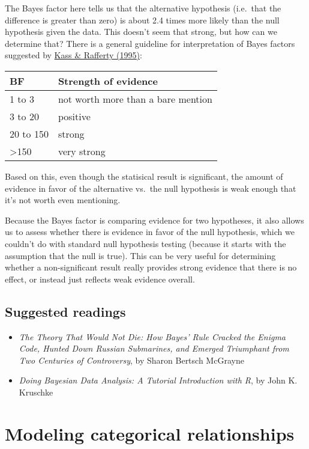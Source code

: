 \documentclass[]{book}
\providecommand{\tightlist}{%
  \setlength{\itemsep}{0pt}\setlength{\parskip}{0pt}}
\theoremstyle{definition}
\theoremstyle{definition}
\theoremstyle{definition}
\theoremstyle{remark}
\begin{document}
The Bayes factor here tells us that the alternative hypothesis
(i.e.~that the difference is greater than zero) is about 2.4 times more
likely than the null hypothesis given the data. This doesn't seem that
strong, but how can we determine that? There is a general guideline for
interpretation of Bayes factors suggested by
\href{https://www.andrew.cmu.edu/user/kk3n/simplicity/KassRaftery1995.pdf}{Kass
\& Rafferty (1995)}:

\begin{longtable}[]{@{}ll@{}}
\toprule
BF & Strength of evidence\tabularnewline
\midrule
\endhead
1 to 3 & not worth more than a bare mention\tabularnewline
3 to 20 & positive\tabularnewline
20 to 150 & strong\tabularnewline
\textgreater{}150 & very strong\tabularnewline
\bottomrule
\end{longtable}

Based on this, even though the statisical result is significant, the
amount of evidence in favor of the alternative vs.~the null hypothesis
is weak enough that it's not worth even mentioning.

Because the Bayes factor is comparing evidence for two hypotheses, it
also allows us to assess whether there is evidence in favor of the null
hypothesis, which we couldn't do with standard null hypothesis testing
(because it starts with the assumption that the null is true). This can
be very useful for determining whether a non-significant result really
provides strong evidence that there is no effect, or instead just
reflects weak evidence overall.

\section{Suggested readings}\label{suggested-readings-8}

\begin{itemize}
\tightlist
\item
  \emph{The Theory That Would Not Die: How Bayes' Rule Cracked the
  Enigma Code, Hunted Down Russian Submarines, and Emerged Triumphant
  from Two Centuries of Controversy}, by Sharon Bertsch McGrayne
\item
  \emph{Doing Bayesian Data Analysis: A Tutorial Introduction with R},
  by John K. Kruschke
\end{itemize}

\chapter{Modeling categorical
relationships}\label{modeling-categorical-relationships}
\end{document}

